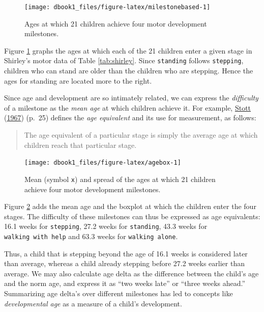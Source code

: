 \documentclass[
]{book}
\begin{document}
\begin{figure}

{\centering \texttt{[image: dbook1\_files/figure-latex/milestonebased-1]} 

}

\caption{Ages at which 21 children achieve four motor development milestones.}\label{fig:milestonebased}
\end{figure}



Figure \ref{fig:milestonebased} graphs the ages at which each of the 21 children enter a given stage in Shirley's motor data of Table \ref{tab:shirley}. Since \texttt{standing} follows \texttt{stepping}, children who can stand are older than the children who are stepping. Hence the ages for standing are located more to the right.

Since age and development are so intimately related, we can express the \emph{difficulty} of a milestone as the \emph{mean age} at which children achieve it. For example, \protect\hyperlink{ref-stott1967}{Stott} (\protect\hyperlink{ref-stott1967}{1967}) (p.~25) defines the \emph{age equivalent} and its use for measurement, as follows:

\begin{quote}
The age equivalent of a particular stage is simply the average age at which children reach that particular stage.
\end{quote}

\begin{figure}

{\centering \texttt{[image: dbook1\_files/figure-latex/agebox-1]} 

}

\caption{Mean (symbol \texttt{x}) and spread of the ages at which 21 children achieve four motor development milestones.}\label{fig:agebox}
\end{figure}



Figure \ref{fig:agebox} adds the mean age and the boxplot at which the children enter the four stages. The difficulty of these milestones can thus be expressed as age equivalents: 16.1 weeks for \texttt{stepping}, 27.2 weeks for \texttt{standing}, 43.3 weeks for \texttt{walking\ with\ help} and 63.3 weeks for \texttt{walking\ alone}.

Thus, a child that is stepping beyond the age of 16.1 weeks is considered later than average, whereas a child already stepping before 27.2 weeks earlier than average. We may also calculate age delta as the difference between the child's age and the norm age, and express it as ``two weeks late'' or ``three weeks ahead.'' Summarizing age delta's over different milestones has led to concepts like \emph{developmental age} as a measure of a child's development.
\end{document}
